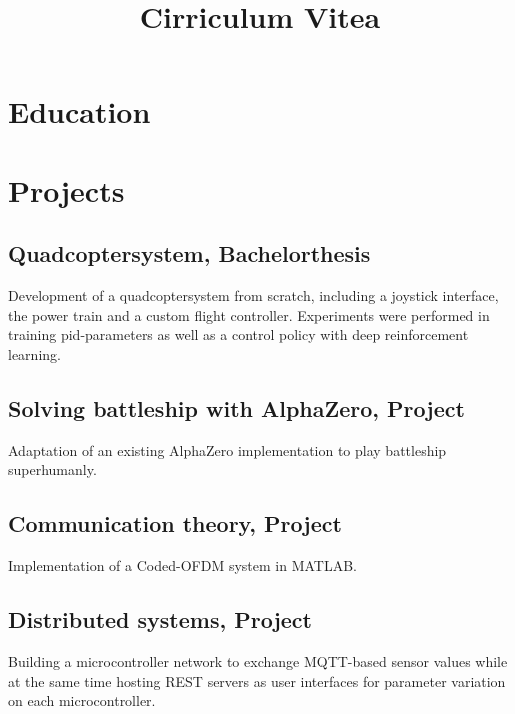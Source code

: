 \documentclass[10pt, a4paper, sans]{moderncv}
\title{Cirriculum Vitea}
\begin{document}

\makecvtitle

\vspace{-1cm}

\section{Education}

\section{Projects}
\subsection*{Quadcoptersystem, Bachelorthesis}
Development of a quadcoptersystem from scratch, including a joystick interface, the power train and a custom flight controller. Experiments were performed in training pid-parameters as well as a control policy with deep reinforcement learning.
\subsection*{Solving battleship with AlphaZero, Project}
Adaptation of an existing AlphaZero implementation to play battleship superhumanly.
\subsection{Communication theory, Project}
Implementation of a Coded-OFDM system in MATLAB.
\subsection{Distributed systems, Project}
Building a microcontroller network to exchange MQTT-based sensor values while at the same time hosting REST servers as user interfaces for parameter variation on each microcontroller.
\end{document}
